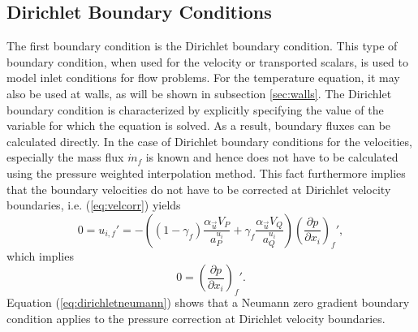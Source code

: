 \subsection{Dirichlet Boundary Conditions}
\label{sec:segDirichlet}

The first boundary condition is the Dirichlet boundary condition. This type of boundary condition, when used for the velocity or transported scalars, is used to model inlet conditions for flow problems. For the temperature equation, it may also be used at walls, as will be shown in subsection \ref{sec:walls}. The Dirichlet boundary condition is characterized by explicitly specifying the value of the variable for which the equation is solved. As a result, boundary fluxes can be calculated directly. In the case of Dirichlet boundary conditions for the velocities, especially the mass flux \(\dot{m}_f\) is known and hence does not have to be calculated using the pressure weighted interpolation method. This fact furthermore implies that the boundary velocities do not have to be corrected at Dirichlet velocity boundaries, i.e. (\ref{eq:velcorr}) yields
\begin{displaymath}
  0 
  =
  u_{i,f}' 
  = 
  - \left(\left(1 - \gamma_f\right) \frac{\alpha_\vec{u} V_P}{a_P^{u_i}} + \gamma_f \frac{\alpha_\vec{u} V_Q}{a_Q^{u_i}}\right)
  \left(\frac{\partial p}{\partial x_i}\right)_f',
\end{displaymath}
which implies
\begin{equation}
  \label{eq:dirichletneumann}
  0 = \left(\frac{\partial p}{\partial x_i}\right)_f'.
\end{equation}
Equation (\ref{eq:dirichletneumann}) shows that a Neumann zero gradient boundary condition applies to the pressure correction at Dirichlet velocity boundaries.

